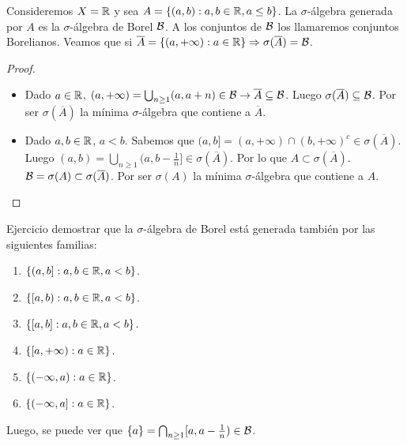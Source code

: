 \begin{eg}
    Consideremos $X = \mathbb{R}$ y sea $A = \{ (a, b) : a, b \in \mathbb{R}, a \leq b \}$. La $\sigma$-álgebra generada por $A$ es la $\sigma$-álgebra de Borel $\mathcal{B}$.
    A los conjuntos de $\mathcal{B}$ los llamaremos conjuntos Borelianos. Veamos que si $\overline{A} = \{ (a, +\infty) : a \in \mathbb{R} \} \Rightarrow \sigma(\overline{A}) = \mathcal{B}$.
    \begin{proof}
        \begin{itemize}
            \item Dado $a \in \mathbb{R}$, $(a, +\infty) = \bigcup_{n \geq 1} (a, a+n) \in \mathcal{B} \to \overline{A} \subseteq \mathcal{B}$.
                  Luego $\sigma(\overline{A}) \subseteq \mathcal{B}$. Por ser $\sigma(\overline{A})$ la mínima $\sigma$-álgebra que contiene a $\overline{A}$.
            \item Dado $a, b \in \mathbb{R}$, $a < b$. Sabemos que $(a, b] = (a, +\infty) \cap (b, +\infty)^c \in \sigma(\overline{A})$.
                  Luego $(a, b) = \bigcup_{n \geq 1} (a, b - \frac{1}{n}] \in \sigma(\overline{A})$. Por lo que $A \subset \sigma(\overline{A})$.
                  $\mathcal{B} = \sigma(A) \subset \sigma(\overline{A})$. Por ser $\sigma(A)$ la mínima $\sigma$-álgebra que contiene a $A$.
        \end{itemize}
    \end{proof}
\end{eg}

Ejercicio demostrar que la $\sigma$-álgebra de Borel está generada también por las siguientes familias:
\begin{enumerate}
    \item $\{ (a, b] : a, b \in \mathbb{R}, a < b \}$.
    \item $\{ [a, b) : a, b \in \mathbb{R}, a < b \}$.
    \item $\{ [a, b] : a, b \in \mathbb{R}, a < b \}$.
    \item $\{ [a, +\infty) : a \in \mathbb{R} \}$.
    \item $\{ (-\infty, a) : a \in \mathbb{R} \}$.
    \item $\{ (-\infty, a] : a \in \mathbb{R} \}$.
\end{enumerate}

Luego, se puede ver que $\{ a \} = \bigcap_{n \geq 1} [a, a - \frac{1}{n}) \in \mathcal{B}$.
